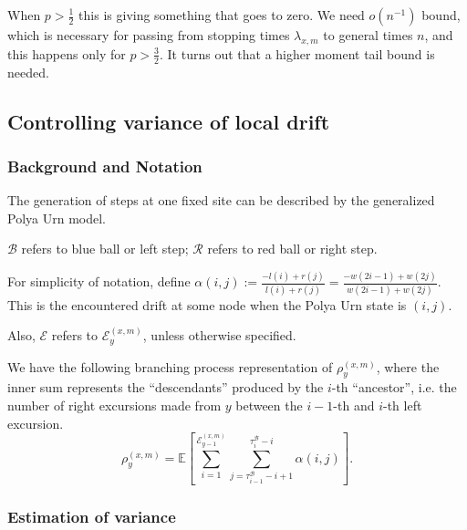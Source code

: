 When $p >  \frac{1}{2}$ this is giving something that goes to zero. We need $o(n^{-1})$ bound, which is necessary for passing from stopping times $\lambda_{x,m}$ to general times $n$, and this happens only for $p > \frac{3}{2}$. It turns out that a higher moment tail bound is needed.

\subsection{Controlling variance of local drift}

\subsubsection{Background and Notation}

The generation of steps at one fixed site can be described by the generalized Polya Urn model.

\begin{notation}
	$\mathcal{B}$ refers to blue ball or left step; $\mathcal{R}$ refers to red ball or right step.
\end{notation}


\begin{notation}
	For simplicity of notation, define $\alpha(i,j) := \frac{- l(i) + r(j)}{l(i) + r(j)} = \frac{-w(2 i - 1) + w(2j)}{w(2i-1)+w(2j)}$. This is the encountered drift at some node when the Polya Urn state is $(i,j)$.
\end{notation}

Also, $\mathcal{E}$ refers to $\mathcal{E}_y^{(x,m)}$, unless otherwise specified.

We have the following branching process representation of $\rho_y^{(x,m)}$, where the inner sum represents the ``descendants'' produced by the $i$-th ``ancestor'', i.e. the number of right excursions made from $y$ between the $i -1$-th and $i$-th left excursion.
\[
	\rho_y^{(x,m)} = \mathbb{E}\left[ \sum_{i = 1}^{\mathcal{E}_{y-1}^{(x,m)}} 
		\sum_{j = \tau_{i-1}^{\mathcal{B}}-i+1}^{\tau_i^{\mathcal{B}}-i}   
		\alpha(i, j) 
\right] 
	.
\]

\subsubsection{Estimation of variance}
 
